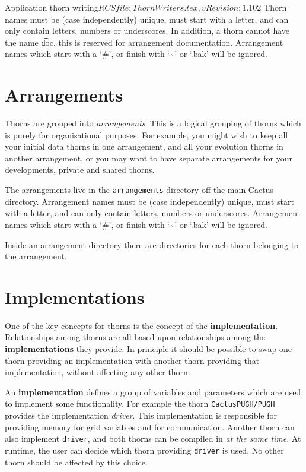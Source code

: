 \begin{cactuspart}{2}{Application thorn writing}{$RCSfile: ThornWriters.tex,v $}{$Revision: 1.102 $}
Thorn names must be (case independently) unique, must start with a letter,
and can only contain
letters, numbers or underscores.
In addition, a thorn cannot have the name {\t doc}, this is reserved
for arrangement documentation. Arrangement names which start with a
`\#', or finish with `\~{}' or `.bak' will be ignored.



\section{Arrangements}

Thorns are grouped into {\em arrangements}.  This is a logical grouping of
thorns which is purely for organisational purposes. For example,
you might wish to keep all your initial data thorns in one arrangement,
and all your evolution thorns in another arrangement, or you may want
to have separate arrangements for your developments, private and shared
thorns.

The arrangements live in the {\tt arrangements} directory off the main
Cactus directory.  Arrangement names must be (case independently) unique,
must start with a letter,
and can only contain
letters, numbers or underscores. Arrangement names which start with a
`\#', or finish with `\~{}' or `.bak' will be ignored.

Inside an arrangement directory there are directories for each thorn
belonging to the arrangement.

\section{Implementations}

\label{sec:im}

One of the key concepts for thorns is the concept of the {\bf implementation}.
Relationships among thorns are all based upon relationships among the
{\bf implementations} they provide.
In principle it should be possible to swap one thorn providing an
implementation with another thorn providing that implementation,
without affecting any other thorn.

An {\bf implementation} defines a group of variables and parameters which
are used to implement some functionality.  For example the thorn
{\tt CactusPUGH/PUGH} provides the implementation {\it driver}.  This
implementation is responsible for providing memory for grid variables and
for communication.  Another thorn can also implement {\tt driver},
and both thorns can be compiled in {\em at the same time}.
At runtime, the user can decide which thorn providing {\tt driver} is used.
No other thorn should be affected by this choice.


\end{cactuspart}
